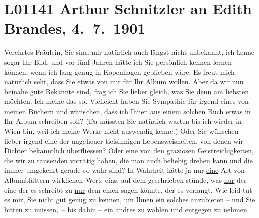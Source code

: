 

\section[Arthur Schnitzler an Edith Brandes, 4. 7. 1901]{L01141 Arthur Schnitzler an Edith Brandes, 4. 7. 1901}
\nopagebreak{}
\rehead{ }\normalsize\beginnumbering{}
\toendnotes[C]{\smallbreak\pagebreak[2]}
\toendnotes[C]{\smallbreak}
\toendnotes[C]{\smallbreak}
\pstart{}{\pb}Verehrtes Fräulein,\pend\vspace{0.5em}
\pstart
           Sie sind mir natürlich auch längst nicht unbekannt, ich kenne sogar Ihr Bild, und vor
               fünf Jahren hätte ich Sie persönlich kennen lernen können, wenn ich lang genug in Kopenhagen geblieben wäre. Es freut mich
               natürlich sehr, dass Sie etwas von mir für Ihr Album wollen. Aber da wir nun beinahe
               gute Bekannte sind, frag ich Sie lieber gleich, was Sie denn am liebsten möchten. Ich
               meine das so. Vielleicht haben Sie Sympathie für irgend eines von meinen Büchern und
               wünschen, dass ich Ihnen aus einem solchen Buch etwas in Ihr Album schreiben soll?
               (Da müssten Sie natürlich warten bis ich wieder in Wien bin, weil ich meine Werke nicht auswendig kenne.) Oder Sie wünschen
               lieber irgend eine der ungeheuer tiefsinnigen Lebensweisheiten, von denen wir Dichter
               bekanntlich überfliessen? Oder eine von den graziösen Geistreichigkeiten, die wir zu
               tausenden vorrätig haben, die man auch beliebig drehen kann und die immer umgekehrt
               gerade so wahr sind? In Wahrheit hätte ja nur \uline{eine}
               Art von Albumblättern wirklichen Wert: eins, auf dem geschrieben stünde, was \uline{nur} der eine der es schreibt zu \uline{nur} dem einen sagen könnte, der es verlangt. Wie leid tut es mir, Sie
               nicht gut genug zu kennen, um Ihnen ein solches anzubieten – und Sie bitten zu
               müssen, – bis dahin – ein andres zu wählen und entgegen zu nehmen.\pend
           
